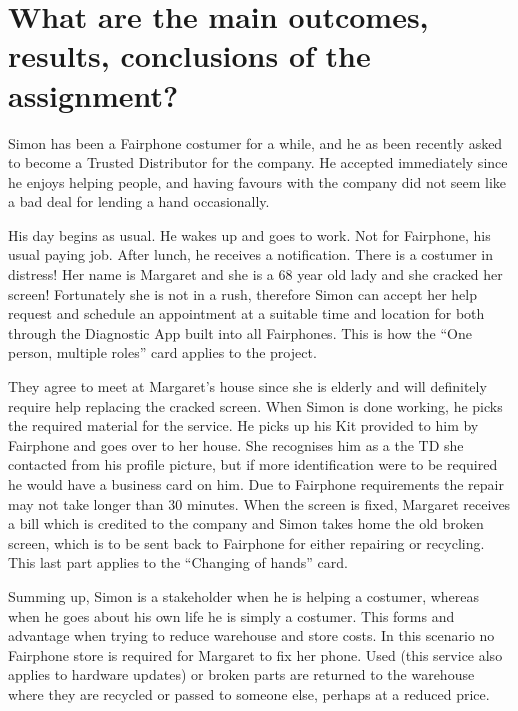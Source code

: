 \section{What are the main outcomes, results, conclusions of the assignment?}

Simon has been a Fairphone costumer for a while, and he as been recently asked to become a Trusted Distributor for the company. He accepted immediately since he enjoys helping people, and having favours with the company did not seem like a bad deal for lending a hand occasionally. 

His day begins as usual. He wakes up and goes to work. Not for Fairphone, his usual paying job. After lunch, he receives a notification. There is a costumer in distress! Her name is Margaret and she is a 68 year old lady and she cracked her screen! Fortunately she is not in a rush, therefore Simon can accept her help request and schedule an appointment at a suitable time and location for both through the Diagnostic App built into all Fairphones. This is how the ``One person, multiple roles'' card applies to the project.

They agree to meet at Margaret's house since she is elderly and will definitely require help replacing the cracked screen. When Simon is done working, he picks the required material for the service. He picks up his Kit provided to him by Fairphone and goes over to her house. She recognises him as a the TD she contacted from his profile picture, but if more identification were to be required he would have a business card on him. Due to Fairphone requirements the repair may not take longer than 30 minutes. When the screen is fixed, Margaret receives a bill which is credited to the company and Simon takes home the old broken screen, which is to be sent back to Fairphone for either repairing or recycling. This last part applies to the ``Changing of hands'' card.  

Summing up, Simon is a stakeholder when he is helping a costumer, whereas when he goes about his own life he is simply a costumer. This forms and advantage when trying to reduce warehouse and store costs. In this scenario no Fairphone store is required for Margaret to fix her phone. Used (this service also applies to hardware updates) or broken parts are returned to the warehouse where they are recycled or passed to someone else, perhaps at a reduced price.
